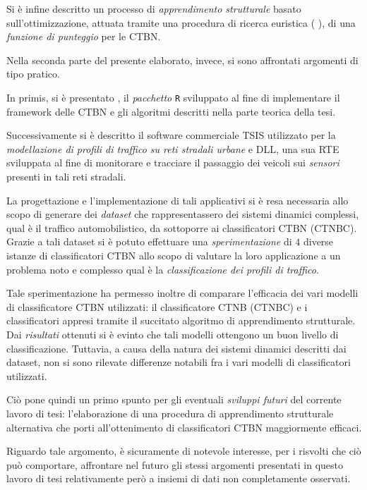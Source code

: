 Si è infine descritto un processo di \emph{apprendimento strutturale} basato sull'ottimizzazione, attuata tramite una procedura di ricerca euristica (\ie{} \emph{\hc{}}), di una \emph{funzione di punteggio} per le \acs{CTBN}.

Nella seconda parte del presente elaborato, invece, si sono affrontati argomenti di tipo pratico.

In primis, si è presentato \rctbn{}, il \emph{pacchetto} \lstinline$R$ sviluppato al fine di implementare il framework delle \acs{CTBN} e gli algoritmi descritti nella parte teorica della tesi.

Successivamente si è descritto il software commerciale \acs{TSIS} utilizzato per la \emph{modellazione di profili di traffico su reti stradali urbane} e  \acs{DLL}, una sua \acl{RTE} sviluppata al fine di monitorare e tracciare il passaggio dei veicoli sui \emph{sensori} presenti in tali reti stradali.

La progettazione e l'implementazione di tali applicativi si è resa necessaria allo scopo di generare dei \emph{dataset} che rappresentassero dei sistemi dinamici complessi, qual è il traffico automobilistico, da sottoporre ai classificatori \acs{CTBN} (\acs{CTNBC}). Grazie a tali dataset si è potuto effettuare una \emph{sperimentazione} di $4$ diverse istanze di classificatori \acs{CTBN} allo scopo di valutare la loro applicazione a un problema noto e complesso qual è la \emph{classificazione dei profili di traffico}.

Tale sperimentazione ha permesso inoltre di comparare l'efficacia dei vari modelli di classificatore \acs{CTBN} utilizzati: il classificatore \acl{CTNB} (\acs{CTNBC}) e i classificatori appresi tramite il succitato algoritmo di apprendimento strutturale. Dai \emph{risultati} ottenuti si è evinto che tali modelli ottengono un buon livello di classificazione. Tuttavia, a causa della natura dei sistemi dinamici descritti dai dataset, non si sono rilevate differenze notabili fra i vari modelli di classificatori utilizzati.

Ciò pone quindi un primo spunto per gli eventuali \emph{sviluppi futuri} del corrente lavoro di tesi: l'elaborazione di una procedura di apprendimento strutturale alternativa che porti all'ottenimento di classificatori \acs{CTBN} maggiormente efficaci.

Riguardo tale argomento, è sicuramente di notevole interesse, per i risvolti che ciò può comportare, affrontare nel futuro gli stessi argomenti presentati in questo lavoro di tesi relativamente però a insiemi di dati non completamente osservati.

